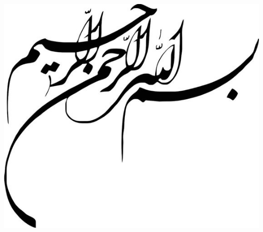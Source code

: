\documentclass[a4paper,oneside,12pt]{report}
\begin{document}
\newpage
\thispagestyle{empty}
\begin{center}
\includegraphics[scale=0.8]{besm}
\end{center}
\newpage
\thispagestyle{empty}
\vspace{\fill}
\end{document}
